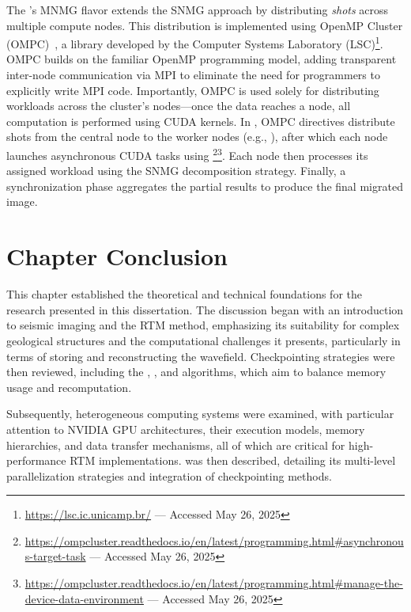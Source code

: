 \documentclass[Ingles,Final]{ic-tese-v3}
\begin{document}
The \awave's MNMG flavor extends the SNMG approach by distributing \textit{shots} across multiple compute nodes. This distribution is implemented using OpenMP Cluster (OMPC)~\cite{ompc}, a library developed by the Computer Systems Laboratory (LSC)\footnote{\url{https://lsc.ic.unicamp.br/} — Accessed May 26, 2025}. OMPC builds on the familiar OpenMP programming model, adding transparent inter-node communication via MPI to eliminate the need for programmers to explicitly write MPI code. Importantly, OMPC is used solely for distributing workloads across the cluster’s nodes—once the data reaches a node, all computation is performed using CUDA kernels. In \awave, OMPC directives distribute shots from the central node to the worker nodes (e.g., ), after which each node launches asynchronous CUDA tasks using \footnote{\url{https://ompcluster.readthedocs.io/en/latest/programming.html\#asynchronous-target-task} — Accessed May 26, 2025}\footnote{\url{https://ompcluster.readthedocs.io/en/latest/programming.html\#manage-the-device-data-environment} — Accessed May 26, 2025}. Each node then processes its assigned workload using the SNMG decomposition strategy. Finally, a synchronization phase aggregates the partial results to produce the final migrated image.

\section{Chapter Conclusion}
\label{sec:background_conclusion}

This chapter established the theoretical and technical foundations for the research presented in this dissertation. The discussion began with an introduction to seismic imaging and the RTM method, emphasizing its suitability for complex geological structures and the computational challenges it presents, particularly in terms of storing and reconstructing the wavefield. Checkpointing strategies were then reviewed, including the \revolve, \uniform, and \zcut algorithms, which aim to balance memory usage and recomputation.

Subsequently, heterogeneous computing systems were examined, with particular attention to NVIDIA GPU architectures, their execution models, memory hierarchies, and data transfer mechanisms, all of which are critical for high-performance RTM implementations.  \awave was then described, detailing its multi-level parallelization strategies and integration of checkpointing methods.
\end{document}
